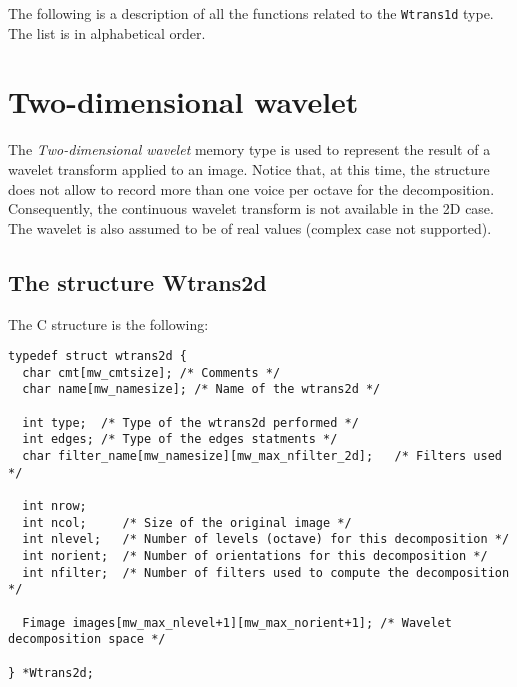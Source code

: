 The following is a description of all the functions related to 
the \verb+Wtrans1d+ type. The list is in alphabetical order.

\newpage %



\section{Two-dimensional wavelet}


\label{wavelets_wtrans2d}

The {\em Two-dimensional wavelet}  memory type is used to represent the result
of a wavelet transform applied to an image.
Notice that, at this time, the structure does not allow to record more than
one voice per octave for the decomposition.
Consequently, the continuous wavelet transform is not available in the 2D case.
The wavelet is also assumed to be of real values (complex case not supported).

\subsection{The structure Wtrans2d}
\label{wavelets_wtrans2d_structure}

\def\wtransdd{{\tt Wtrans2d }}
\index{structure!\wtrans2d@\wtransdd}

The C structure is the following:
{\small
\begin{verbatim}
typedef struct wtrans2d {
  char cmt[mw_cmtsize]; /* Comments */
  char name[mw_namesize]; /* Name of the wtrans2d */

  int type;  /* Type of the wtrans2d performed */
  int edges; /* Type of the edges statments */
  char filter_name[mw_namesize][mw_max_nfilter_2d];   /* Filters used */

  int nrow;
  int ncol;     /* Size of the original image */
  int nlevel;   /* Number of levels (octave) for this decomposition */
  int norient;  /* Number of orientations for this decomposition */
  int nfilter;  /* Number of filters used to compute the decomposition */

  Fimage images[mw_max_nlevel+1][mw_max_norient+1]; /* Wavelet decomposition space */

} *Wtrans2d;
\end{verbatim}
}

